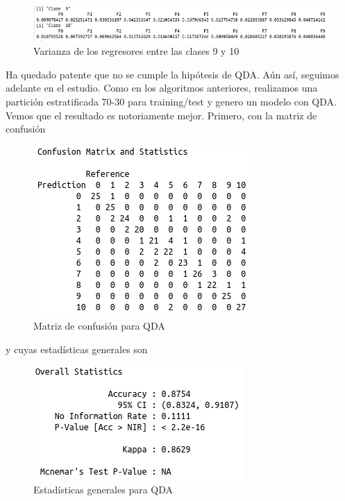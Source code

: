 \begin{figure}[H] %
	\centering
	\includegraphics[scale=0.5]{var3-qda.png}  %
	\caption{Varianza de los regresores entre las clases 9 y 10} 
	\label{fig:var3-qda}
\end{figure}

Ha quedado patente que no se cumple la hipótesis de QDA. Aún así, seguimos adelante en el estudio. Como en los algoritmos anteriores, realizamos una partición estratificada 70-30 para training/test y genero un modelo con QDA. Vemos que el resultado es notoriamente mejor. Primero, con la matriz de confusión

\begin{figure}[H] %
	\centering
	\includegraphics[scale=0.6]{cm-qda.png}  %
	\caption{Matriz de confusión para QDA} 
	\label{fig:cm-qda}
\end{figure}

y cuyas estadísticas generales son

\begin{figure}[H] %
	\centering
	\includegraphics[scale=0.6]{statis-qda.png}  %
	\caption{Estadísticas generales para QDA} 
	\label{fig:statis-qda}
\end{figure}


